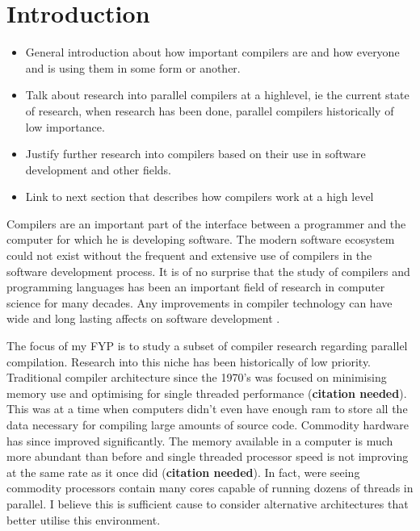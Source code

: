 \section{Introduction} \label{introduction}
\begin{sectionplan}
     \begin{itemize}
          \item  General introduction about how important compilers are and how
                 everyone and is using them in some form or another.

          \item Talk about research into parallel compilers at a highlevel,
                ie the current state of research, when research has been done,
                parallel compilers historically of low importance.

          \item Justify further research into compilers based on their use
                in software development and other fields.

          \item Link to next section that describes how compilers work at a
                high level
     \end{itemize}
\end{sectionplan}

Compilers are an important part of the interface between a programmer and the
computer for which he is developing software. The modern software ecosystem
could not exist without the frequent and extensive use of compilers in the
software development process. It is of no surprise that the study of compilers
and programming languages has been an important field of research in computer
science for many decades. Any improvements in compiler technology can have wide
and long lasting affects on software development \citep{hall_compiler_2009}.

The focus of my FYP is to study a subset of compiler research regarding parallel
compilation. Research into this niche has been historically of low priority.
Traditional compiler architecture since the 1970’s was focused on minimising
memory use and optimising for single threaded performance (\textbf{citation
needed}). This was at a time when computers didn’t even have enough ram to store
all the data necessary for compiling large amounts of source code.  Commodity
hardware has since improved significantly. The memory available in a computer
is much more abundant than before and single threaded processor speed is not
improving at the same rate as it once did (\textbf{citation needed}). In fact,
were seeing commodity processors contain many cores capable of running dozens of
threads in parallel. I believe this is sufficient cause to consider alternative
architectures that better utilise this environment.

